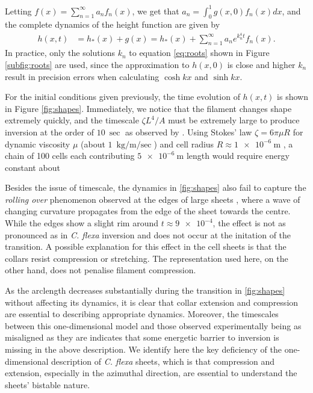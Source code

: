 Letting $f(x) = \sum_{n=1}^\infty a_n f_n(x)$, we get that $a_n = \int_0^1 g(x, 0) f_n(x)dx$, and the complete dynamics of the height function are given by 
\begin{align}
    h(x, t) &= h_*(x) + g(x) = h_*(x) + \sum_{n=1}^\infty a_n e^{k_n^4 t} f_n(x). \label{eq:sol}
\end{align}
\noindent In practice, only the solutions $k_n$ to equation \ref{eq:roots} shown in Figure \ref{subfig:roots} are used, since the approximation to $h(x, 0)$ is close and higher $k_n$ result in precision errors when calculating $\cosh kx$ and $\sinh kx$. 

For the initial conditions given previously, the time evolution of $h(x, t)$ is shown in Figure \ref{fig:shapes}. 
Immediately, we notice that the filament changes shape extremely quickly, and the timescale $\zeta L^4 / A$ must be extremely large to produce inversion at the order of $\SI{10}{\sec}$ as observed by \citet{brunet2019}. 
Using Stokes' law $\zeta = 6 \pi \mu R$ for dynamic viscosity $\mu$ (about $\SI{1}{\kilo\gram\per\meter\per\sec}$) \citep{stokes1851} and cell radius $R\approx \SI{1e-6}{\meter}$ \citep{brunet2019}, a chain of 100 cells each contributing $\SI{5e-6}{\meter}$ length would require energy constant about 

Besides the issue of timescale, the dynamics in \cref{fig:shapes} also fail to capture the \textit{rolling over} phenomenon observed at the edges of large sheets \citep{brunet2019}, where a wave of changing curvature propagates from the edge of the sheet towards the centre. 
While the edges show a slight rim around $t\approx\num{9e-4}$, the effect is not as pronounced as in \textit{C. flexa} inversion and does not occur at the initation of the transition.  
A possible explanation for this effect in the cell sheets is that the collars resist compression or stretching. 
The representation used here, on the other hand, does not penalise filament compression.

As the arclength decreases substantially during the transition in \cref{fig:shapes} without affecting its dynamics, it is clear that collar extension and compression are essential to describing appropriate dynamics. Moreover, the timescales between this one-dimensional model and those observed experimentally being as misaligned as they are indicates that some energetic barrier to inversion is missing in the above description. 
We identify here the key deficiency of the one-dimensional description of \textit{C. flexa} sheets, which is that compression and extension, especially in the azimuthal direction, are essential to understand the sheets' bistable nature.

